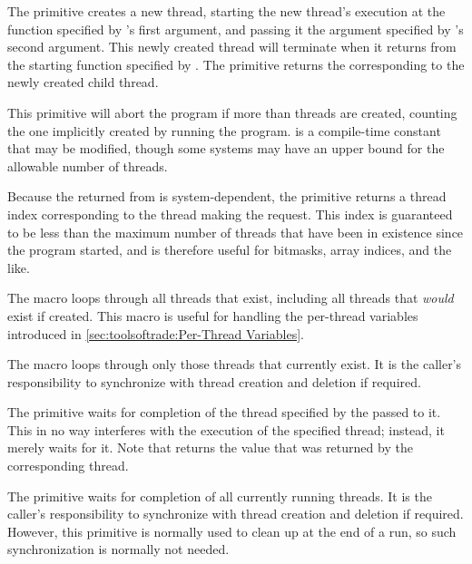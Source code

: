 \begin{description}[style=nextline]
\item[\tco{create_thread()}]
The  primitive creates a new thread,
starting the new thread's execution
at the function  specified by 's
first argument, and passing it the argument specified by
's second argument.
This newly created thread will terminate when it returns from the
starting function specified by .
The  primitive returns the 
corresponding to the newly created child thread.

This primitive will abort the program if more than 
threads are created, counting the one implicitly created by running
the program.
 is a compile-time constant that may be modified,
though some systems may have an upper bound for the allowable number
of threads.

\item[\tco{smp_thread_id()}]
Because the  returned from  is
system-dependent, the  primitive returns a thread
index corresponding to the thread making the request.
This index is guaranteed to be less than the maximum number of threads
that have been in existence since the program started,
and is therefore useful for bitmasks, array indices, and
the like.

\item[\tco{for_each_thread()}]
The  macro loops through all threads that exist,
including all threads that \emph{would} exist if created.
This macro is useful for handling the per-thread variables
introduced in \cref{sec:toolsoftrade:Per-Thread Variables}.

\item[\tco{for_each_running_thread()}]
The 
macro loops through only those threads that currently exist.
It is the caller's responsibility to synchronize with thread
creation and deletion if required.

\item[\tco{wait_thread()}]
The  primitive waits for completion of the thread
specified by the  passed to it.
This in no way interferes with the execution of the specified thread;
instead, it merely waits for it.
Note that  returns the value that was returned by
the corresponding thread.

\item[\tco{wait_all_threads()}]
The 
primitive waits for completion of all currently running threads.
It is the caller's responsibility to synchronize with thread creation
and deletion if required.
However, this primitive is normally used to clean up at the end of
a run, so such synchronization is normally not needed.

\end{description}

